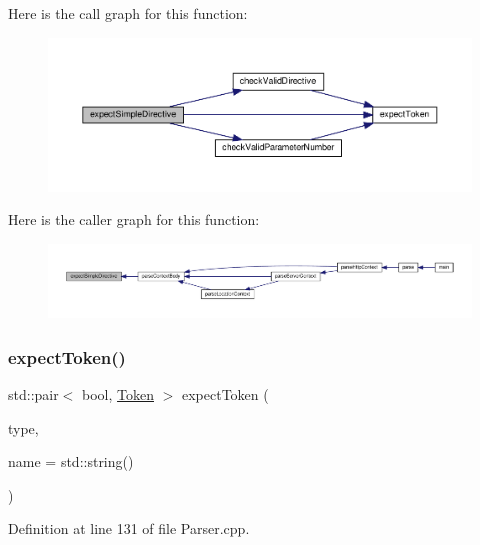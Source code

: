 Here is the call graph for this function\+:
\nopagebreak
\begin{figure}[H]
\begin{center}
\leavevmode
\includegraphics[width=350pt]{classft_1_1_parser_a81d18b750d54e1e3002070531045171b_cgraph}
\end{center}
\end{figure}
Here is the caller graph for this function\+:
\nopagebreak
\begin{figure}[H]
\begin{center}
\leavevmode
\includegraphics[width=350pt]{classft_1_1_parser_a81d18b750d54e1e3002070531045171b_icgraph}
\end{center}
\end{figure}
\mbox{\label{classft_1_1_parser_a1615a752d3642bb53598e2c8db810db0}} 
\subsubsection{\texorpdfstring{expect\+Token()}{expectToken()}}
{\footnotesize\ttfamily std\+::pair$<$ bool, \hyperlink{classft_1_1_token}{Token} $>$ expect\+Token (\begin{DoxyParamCaption}\item[{enum \hyperlink{namespaceft_aa520fbf142ba1e7e659590c07da31921}{Token\+Type}}]{type,  }\item[{const std\+::string \&}]{name = {\ttfamily std\+:\+:string()} }\end{DoxyParamCaption})}



Definition at line 131 of file Parser.\+cpp.


